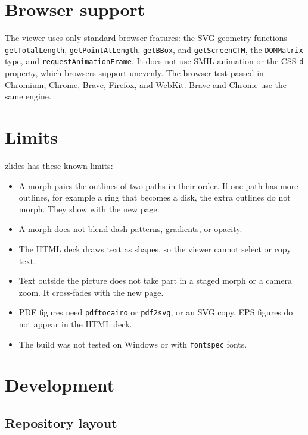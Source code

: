 \documentclass[11pt]{article}
\newcommand{\pkg}{\textsf{zlides}}
\newcommand{\cmd}[1]{\texttt{#1}}
\begin{document}
\section{Browser support}

\begin{sloppypar}
	The viewer uses only standard browser features: the SVG geometry functions
	\cmd{getTotalLength}, \cmd{getPointAtLength}, \cmd{getBBox}, and
	\cmd{getScreenCTM}, the \cmd{DOMMatrix} type, and \cmd{requestAnimationFrame}. It
	does not use SMIL animation or the CSS \cmd{d} property, which browsers support
	unevenly. The browser test passed in Chromium, Chrome, Brave, Firefox, and WebKit.
	Brave and Chrome use the same engine.
\end{sloppypar}

\section{Limits}

\pkg{} has these known limits:
\begin{itemize}
	\item A morph pairs the outlines of two paths in their order. If one path has
	      more outlines, for example a ring that becomes a disk, the extra outlines do
	      not morph. They show with the new page.
	\item A morph does not blend dash patterns, gradients, or opacity.
	\item The HTML deck draws text as shapes, so the viewer cannot select or copy
	      text.
	\item Text outside the picture does not take part in a staged morph or a camera
	      zoom. It cross-fades with the new page.
	\item PDF figures need \cmd{pdftocairo} or \cmd{pdf2svg}, or an SVG copy. EPS figures do not appear in the HTML deck.
	\item The build was not tested on Windows or with \cmd{fontspec} fonts.
\end{itemize}

\section{Development}

\subsection{Repository layout}
\end{document}
